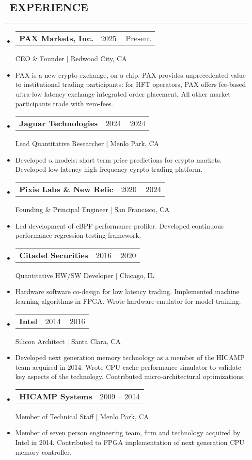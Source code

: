 \documentclass[10pt,letterpaper]{article}
\makeatletter
\newenvironment{resumesection}[1]
{%
    \subsection*{\ \textcolor{light-gray}{#1} }
    \vspace{-0.4em}
    \begin{samepage}
    \hrule
    \end{samepage}
    \vspace{+0.4em}
    \begin{itemize}[leftmargin=0.15cm]
        \parskip=0.1em
}%
{%
    \end{itemize}
}%
\newcommand{\myitem}[1] {
    \item[] \textcolor{dark-gray}{#1}
}
\newcommand{\headertri}[3] {
    \item[] \begin{tabular*}{\linewidth}{l@{\extracolsep{\fill}}r}
    \textbf{#1} & #2 \\
    \end{tabular*}
    #3
}
\newcommand{\cminiw}{0.075}
\newcommand{\rminiw}{0.550}
\makeatother
\begin{document}
\begin{minipage}[t]{\cminiw\textwidth}
\end{minipage}\hfill
\begin{minipage}[t]{\rminiw\textwidth}
\begin{resumesection}{EXPERIENCE}
    \headertri
    {PAX Markets, Inc.}
    {2025 -- Present}
    {CEO \& Founder | Redwood City, CA}
    \myitem{
        PAX is a new crypto exchange, on a chip. %
        PAX provides unprecedented value to institutional trading participants:
        for HFT operators, PAX offers fee-based ultra-low latency exchange integrated order placement.
        All other market participants trade with zero-fees.
    }
    
    \headertri
    {Jaguar Technologies}
    {2024 -- 2024}
    {Lead Quantitative Researcher | Menlo Park, CA}
    \myitem{
        Developed $\mathrm{ \alpha }$ models: short term price predictions for crypto markets.
        Developed low latency high frequency cyrpto trading platform.
    }
    
    \headertri
    {Pixie Labs \& New Relic}
    {2020 -- 2024}
    {Founding \& Principal Engineer | San Francisco, CA}
    \myitem{
        Led development of eBPF performance profiler.
        Developed continuous performance regression testing framework.
    }
    
    \headertri
    {Citadel Securities}
    {2016 -- 2020}
    {Quantitative HW/SW Developer | Chicago, IL}
    \myitem{
        Hardware software co-design for low latency trading.
        Implemented machine learning algorithms in FPGA.
        Wrote hardware emulator for model training.
    }
    
    \headertri
    {Intel}
    {2014 -- 2016}
    {Silicon Architect | Santa Clara, CA}
    \myitem{
        Developed next generation memory technology as a member of the HICAMP team acquired in 2014.
        Wrote CPU cache performance simulator to validate key aspects of the technology.
        Contributed micro-architectural optimizations.
    }
    
    
    \headertri
    {HICAMP Systems}
    {2009 -- 2014}
    {Member of Technical Staff | Menlo Park, CA}
    \myitem{
        Member of seven person engineering team, firm and technology acquired by Intel in 2014.
        Contributed to FPGA implementation of next generation CPU memory controller.
    }
    

\end{resumesection}
\end{minipage}
\end{document}
